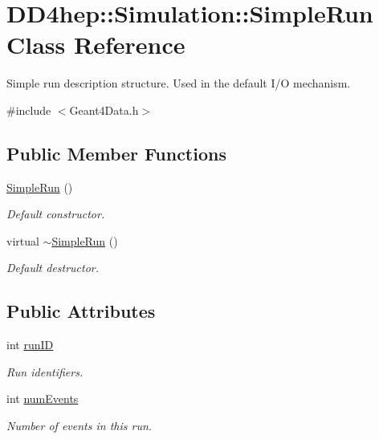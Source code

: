 \hypertarget{class_d_d4hep_1_1_simulation_1_1_simple_run}{}\section{D\+D4hep\+:\+:Simulation\+:\+:Simple\+Run Class Reference}
\label{class_d_d4hep_1_1_simulation_1_1_simple_run}


Simple run description structure. Used in the default I/O mechanism.  




{\ttfamily \#include $<$Geant4\+Data.\+h$>$}

\subsection*{Public Member Functions}
\begin{DoxyCompactItemize}
\item 
\hyperlink{class_d_d4hep_1_1_simulation_1_1_simple_run_a50e522275d994ec00d6e3a2d842713d5}{Simple\+Run} ()
\begin{DoxyCompactList}\small\item\em Default constructor. \end{DoxyCompactList}\item 
virtual \hyperlink{class_d_d4hep_1_1_simulation_1_1_simple_run_a492b495267498387129a39d1c3da0850}{$\sim$\+Simple\+Run} ()
\begin{DoxyCompactList}\small\item\em Default destructor. \end{DoxyCompactList}\end{DoxyCompactItemize}
\subsection*{Public Attributes}
\begin{DoxyCompactItemize}
\item 
int \hyperlink{class_d_d4hep_1_1_simulation_1_1_simple_run_a8d376fdac80fb3d671037537ca3aa858}{run\+ID}
\begin{DoxyCompactList}\small\item\em Run identifiers. \end{DoxyCompactList}\item 
int \hyperlink{class_d_d4hep_1_1_simulation_1_1_simple_run_a7cbde1fd06c8893176d8d7b70386281d}{num\+Events}
\begin{DoxyCompactList}\small\item\em Number of events in this run. \end{DoxyCompactList}\end{DoxyCompactItemize}


